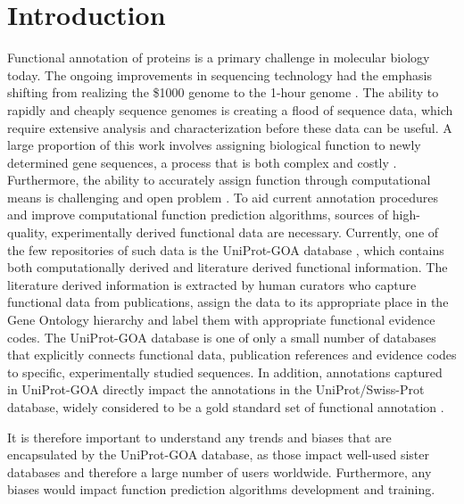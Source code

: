 \documentclass[12pt]{article}
\begin{document}
\section*{Introduction}

Functional annotation of proteins is a primary challenge in molecular biology
today\cite{Friedberg2006Automated, Erdin2011180, Rentzsch2009210, Fetrow2012}. The ongoing
improvements in sequencing technology had the emphasis shifting from realizing the \$1000 genome to
the 1-hour genome \cite{PMID Stahl2012Toward}. The ability to rapidly and cheaply sequence genomes
is creating a flood of sequence data, which require extensive analysis and characterization before
these data can be useful. A large proportion of this work involves assigning biological function to
newly determined gene sequences, a process that is both complex and costly \cite{Sboner2011Real}.
Furthermore,  the ability to accurately assign function through computational means is challenging
and open problem \cite{Schnoes2009Annotation}. To aid current annotation procedures and improve
computational function prediction algorithms, sources of high-quality, experimentally derived
functional data are necessary. Currently, one of the few repositories of such data is the
UniProt-GOA database \cite{Dimmer2012UniProtGO}, which contains both computationally derived and
literature derived functional information. The literature derived information is extracted by human
curators who capture functional data from publications, assign the data to its appropriate place in
the Gene Ontology hierarchy \cite{Ashburner2000Gene} and label them with appropriate functional
evidence codes. The UniProt-GOA database is one of only a small number of databases that explicitly
connects functional data, publication references and evidence codes to specific, experimentally
studied sequences.  In addition, annotations captured in UniProt-GOA directly impact the
annotations in the UniProt/Swiss-Prot database, widely considered to be a gold standard set of
functional annotation \cite{Schnoes2009Annotation}. 

It is therefore important to understand any trends and biases that are
encapsulated by the UniProt-GOA database, as those impact well-used sister
databases and therefore a large number of users worldwide. Furthermore,
any biases would impact function prediction algorithms development and training.
\end{document}
